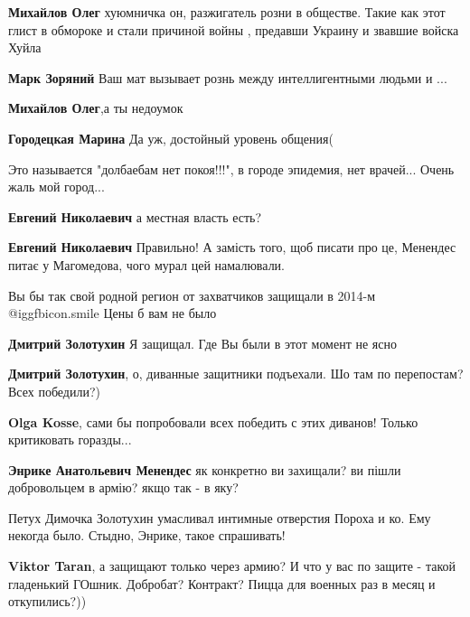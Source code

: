 \begin{itemize}
\begin{itemize}
\textbf{Михайлов Олег} хуюмничка он, разжигатель розни в обществе. Такие как этот глист в обмороке и стали причиной войны , предавши Украину и звавшие войска Хуйла

\textbf{Марк Зоряний}
Ваш мат вызывает рознь между интеллигентными людьми и ...

\textbf{Михайлов Олег},а ты недоумок

\textbf{Городецкая Марина} Да уж, достойный уровень общения(
\end{itemize} %


Это называется "долбаебам нет покоя!!!", в городе эпидемия, нет врачей... Очень
жаль мой город...

\begin{itemize} %
\textbf{Евгений Николаевич} а местная власть есть?

\textbf{Евгений Николаевич} Правильно! А замість того, щоб писати про це, Менендес питає у Магомедова, чого мурал цей намалювали.
\end{itemize} %


Вы бы так свой родной регион от захватчиков защищали в 2014-м  @igg{fbicon.smile} 
Цены б вам не было

\begin{itemize} %
\textbf{Дмитрий Золотухин} Я защищал. Где Вы были в этот момент не ясно

\textbf{Дмитрий Золотухин}, о, диванные защитники подъехали. Шо там по перепостам? Всех победили?)

\textbf{Olga Kosse}, сами бы попробовали всех победить с этих диванов! Только критиковать горазды...

\textbf{Энрике Анатольевич Менендес} як конкретно ви захищали? ви пішли добровольцем в армію? якщо так - в яку?

Петух Димочка Золотухин умасливал интимные отверстия Пороха и ко. Ему некогда было. Стыдно, Энрике, такое спрашивать!

\textbf{Viktor Taran}, а защищают только через армию? И что у вас по защите - такой гладенький ГОшник. Добробат? Контракт? Пицца для военных раз в месяц и откупились?))


\end{itemize}
\end{itemize}
